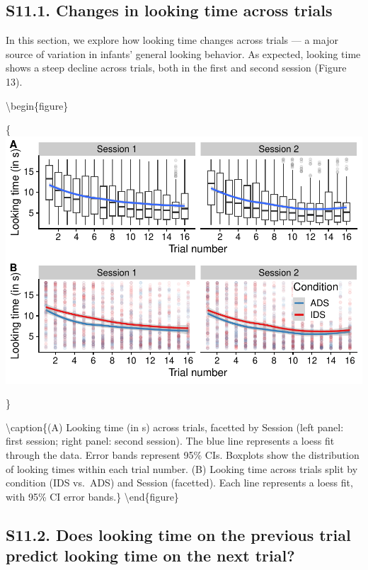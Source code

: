 \documentclass[
  english,
  man, donotrepeattitle,floatsintext]{apa6}
\begin{document}
\hypertarget{s11.1.-changes-in-looking-time-across-trials}{%
\subsection{S11.1. Changes in looking time across trials}\label{s11.1.-changes-in-looking-time-across-trials}}

In this section, we explore how looking time changes across trials --- a major source of variation in infants' general looking behavior.
As expected, looking time shows a steep decline across trials, both in the first and second session (Figure 13).

\textbackslash begin\{figure\}

\{\centering \includegraphics{MB1T_supplement_files/figure-latex/fig13-1}

\}

\textbackslash caption\{(A) Looking time (in s) across trials, facetted by Session (left panel: first session; right panel: second session). The blue line represents a loess fit through the data. Error bands represent 95\% CIs. Boxplots show the distribution of looking times within each trial number. (B) Looking time across trials split by condition (IDS vs.~ADS) and Session (facetted). Each line represents a loess fit, with 95\% CI error bands.\}\label{fig:fig13}
\textbackslash end\{figure\}

\hypertarget{s11.2.-does-looking-time-on-the-previous-trial-predict-looking-time-on-the-next-trial}{%
\subsection{S11.2. Does looking time on the previous trial predict looking time on the next trial?}\label{s11.2.-does-looking-time-on-the-previous-trial-predict-looking-time-on-the-next-trial}}
\end{document}

